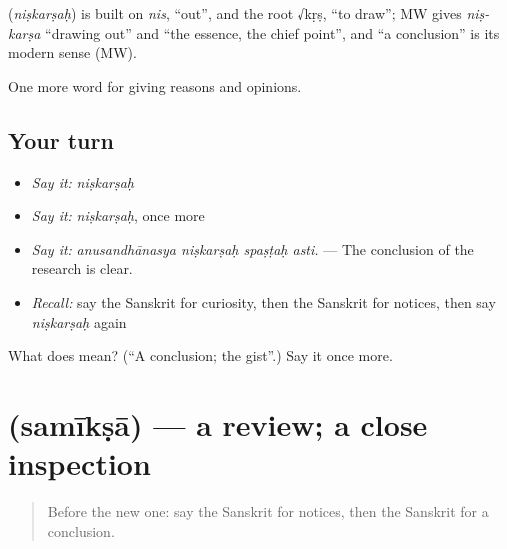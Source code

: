 \begin{cousinweb}
\textbf{} (\emph{niṣkarṣaḥ}) is built on \emph{nis}, \textquotedblleft{}out\textquotedblright{}, and the root √kṛṣ, \textquotedblleft{}to draw\textquotedblright{}; MW gives \emph{niṣ-karṣa} \textquotedblleft{}drawing out\textquotedblright{} and \textquotedblleft{}the essence, the chief point\textquotedblright{}, and \textquotedblleft{}a conclusion\textquotedblright{} is its modern sense (MW).
\end{cousinweb}

\begin{grammarlens}[title={What you've built}]
One more word for giving reasons and opinions.
\end{grammarlens}

\subsection*{Your turn}
\begin{itemize}
\raggedright
  \item \emph{Say it:} \emph{niṣkarṣaḥ}
  \item \emph{Say it:} \emph{niṣkarṣaḥ}, once more
  \item \emph{Say it:} \emph{anusandhānasya niṣkarṣaḥ spaṣṭaḥ asti.} — The conclusion of the research is clear.
  \item \emph{Recall:} say the Sanskrit for curiosity, then the Sanskrit for notices, then say \emph{niṣkarṣaḥ} again
\end{itemize}

\begin{tcolorbox}[breakable,colback=teal!4,colframe=teal!35!black,title={Before you move on}]
What does  mean? (\textquotedblleft{}A conclusion; the gist\textquotedblright{}.) Say it once more.
\end{tcolorbox}
\section[\texorpdfstring{\sk{समीक्षा} (samīkṣā)}{समीक्षा (samīkṣā)}]{ (samīkṣā) — a review; a close inspection}

\label{lesson:SA-C366-samiksa}



\begin{quote}
Before the new one: say the Sanskrit for notices, then the Sanskrit for a conclusion.
\end{quote}

